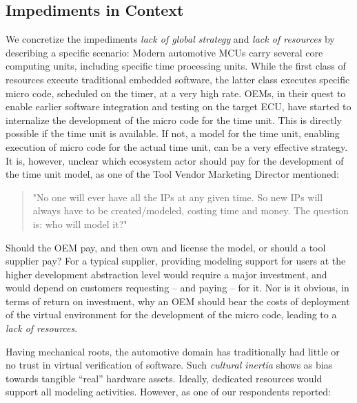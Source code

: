 \subsection{Impediments in Context}
We concretize the impediments 
\emph{lack of global strategy} and \emph{lack of resources}
by describing a specific scenario:
Modern automotive MCUs carry several core computing units, including specific time processing units.
While the first class of resources execute traditional embedded software, the latter class executes specific micro code, scheduled on the timer, at a very high rate.
OEMs, in their quest to enable earlier software integration and testing on the target ECU, have started to internalize the development of the micro code for the time unit.
This is directly possible if the time unit is available.
If not, a model for the time unit, enabling execution of micro code for the actual time unit, can be a very effective strategy.
It is, however, unclear which ecosystem actor should pay for the development of the time unit model, as one of the Tool Vendor Marketing Director mentioned: 

\begin{quote}
"No one will ever have all the IPs at any given time. So new IPs will always have to be created/modeled, costing time and money. The question is: who will model it?"
\end{quote}

Should the OEM pay, and then own and license the model, or should a tool supplier pay?
For a typical supplier, providing modeling support for users at the higher development abstraction level would require a major investment, and would depend on customers requesting -- and paying -- for it.
Nor is it obvious, in terms of return on investment, why an OEM should bear the costs of deployment of the virtual environment for the development of the micro code, leading to a \emph{lack of resources}.


Having mechanical roots, the automotive domain has traditionally had little or no trust in virtual verification of software.
Such \emph{cultural inertia} %
shows as bias towards tangible ``real'' hardware assets.
Ideally, dedicated resources would support all modeling activities.
However, as one of our respondents reported:

